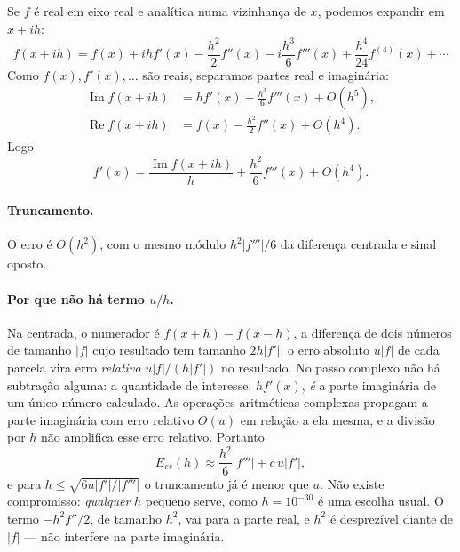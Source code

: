 \documentclass[11pt,a4paper]{article}
\renewcommand{\Im}{\operatorname{Im}}
\renewcommand{\Re}{\operatorname{Re}}
\begin{document}
Se $f$ é real em eixo real e analítica numa vizinhança de $x$, podemos expandir em $x+ih$:
\begin{equation}
f(x+ih) = f(x) + ihf'(x) - \frac{h^2}{2}f''(x) - i\frac{h^3}{6}f'''(x) + \frac{h^4}{24}f^{(4)}(x) + \cdots
\label{eq:taylor-complexo}
\end{equation}
Como $f(x), f'(x),\dots$ são reais, separamos partes real e imaginária:
\begin{align}
\Im f(x+ih) &= hf'(x) - \frac{h^3}{6}f'''(x) + O(h^5), \\
\Re f(x+ih) &= f(x) - \frac{h^2}{2}f''(x) + O(h^4). \label{eq:parte-real}
\end{align}
Logo
\begin{equation}
\boxed{\;f'(x) = \frac{\Im f(x+ih)}{h} + \frac{h^2}{6}f'''(x) + O(h^4).\;}
\end{equation}

\paragraph{Truncamento.} O erro é $O(h^2)$, com o mesmo módulo $h^2|f'''|/6$ da diferença centrada e sinal oposto. 

\paragraph{Por que não há termo $u/h$.} Na centrada, o numerador é $f(x+h)-f(x-h)$, a diferença de dois números de tamanho $|f|$ cujo resultado tem tamanho $2h|f'|$: o erro absoluto $u|f|$ de cada parcela vira erro \emph{relativo} $u|f|/(h|f'|)$ no resultado. No passo complexo não há subtração alguma: a quantidade de interesse, $hf'(x)$, \emph{é} a parte imaginária de um único número calculado. As operações aritméticas complexas propagam a parte imaginária com erro relativo $O(u)$ em relação a ela mesma, e a divisão por $h$ não amplifica esse erro relativo. Portanto
\begin{equation}
E_{cs}(h) \approx \frac{h^2}{6}|f'''| + c\,u|f'| ,
\end{equation}
e para $h\le\sqrt{6u|f'|/|f'''|}$ o truncamento já é menor que $u$. Não existe compromisso: \emph{qualquer} $h$ pequeno serve, como $h=10^{-30}$ é uma escolha usual. O termo $-h^2f''/2$, de tamanho $h^2$, vai para a parte real, e $h^2$ é desprezível diante de $|f|$ --- não interfere na parte imaginária.
\end{document}
